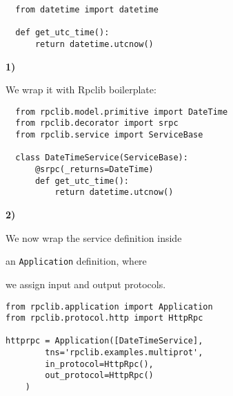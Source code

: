 \documentclass{beamer}
\begin{document}
\begin{frame}[fragile]
  \large
  \begin{lstlisting}
  from datetime import datetime

  def get_utc_time():
      return datetime.utcnow()
  \end{lstlisting}
\end{frame}

\begin{frame}
  \LARGE

  \color{red} \textbf{1)} \color{black}


    \begin{center}
      We wrap it with Rpclib boilerplate:
    \end{center}

\end{frame}

\begin{frame}[fragile]
  \begin{lstlisting}
  from rpclib.model.primitive import DateTime
  from rpclib.decorator import srpc
  from rpclib.service import ServiceBase

  class DateTimeService(ServiceBase):
      @srpc(_returns=DateTime)
      def get_utc_time():
          return datetime.utcnow()
  \end{lstlisting}
\end{frame}

\begin{frame}
  \LARGE

  \color{red} \textbf{2)} \color{black}

  \begin{center}
    We now wrap the service definition inside

    \bigskip

    an \texttt{Application} definition, where

    \bigskip

    we assign input and output protocols.

  \end{center}

\end{frame}

\begin{frame}[fragile]
  \begin{lstlisting}
from rpclib.application import Application
from rpclib.protocol.http import HttpRpc

httprpc = Application([DateTimeService],
        tns='rpclib.examples.multiprot',
        in_protocol=HttpRpc(),
        out_protocol=HttpRpc()
    )
  \end{lstlisting}
\end{frame}
\end{document}
